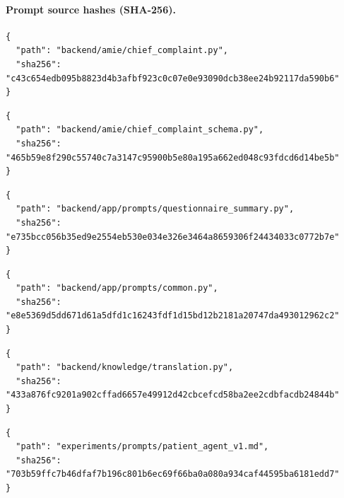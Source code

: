 \paragraph{Prompt source hashes (SHA-256).}
\begin{Verbatim}[breaklines=true,breakanywhere=true,fontsize=\scriptsize]
{
  "path": "backend/amie/chief_complaint.py",
  "sha256": "c43c654edb095b8823d4b3afbf923c0c07e0e93090dcb38ee24b92117da590b6"
}
\end{Verbatim}
\begin{Verbatim}[breaklines=true,breakanywhere=true,fontsize=\scriptsize]
{
  "path": "backend/amie/chief_complaint_schema.py",
  "sha256": "465b59e8f290c55740c7a3147c95900b5e80a195a662ed048c93fdcd6d14be5b"
}
\end{Verbatim}
\begin{Verbatim}[breaklines=true,breakanywhere=true,fontsize=\scriptsize]
{
  "path": "backend/app/prompts/questionnaire_summary.py",
  "sha256": "e735bcc056b35ed9e2554eb530e034e326e3464a8659306f24434033c0772b7e"
}
\end{Verbatim}
\begin{Verbatim}[breaklines=true,breakanywhere=true,fontsize=\scriptsize]
{
  "path": "backend/app/prompts/common.py",
  "sha256": "e8e5369d5dd671d61a5dfd1c16243fdf1d15bd12b2181a20747da493012962c2"
}
\end{Verbatim}
\begin{Verbatim}[breaklines=true,breakanywhere=true,fontsize=\scriptsize]
{
  "path": "backend/knowledge/translation.py",
  "sha256": "433a876fc9201a902cffad6657e49912d42cbcefcd58ba2ee2cdbfacdb24844b"
}
\end{Verbatim}
\begin{Verbatim}[breaklines=true,breakanywhere=true,fontsize=\scriptsize]
{
  "path": "experiments/prompts/patient_agent_v1.md",
  "sha256": "703b59ffc7b46dfaf7b196c801b6ec69f66ba0a080a934caf44595ba6181edd7"
}
\end{Verbatim}
